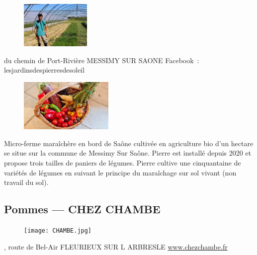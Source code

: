 \documentclass[8pt,a4paper,french]{article}
\makeatletter
\newcommand{\authoredby}[1]{\addtocontents{toc}{\protect\@nameuse{authoredby#1}}}%
\makeatother
\begin{document}
\begin{figure}
\includegraphics[width=0.3\textwidth]{LALAURE1.jpg}
\end{figure}

 du chemin de Port-Rivière MESSIMY SUR SAONE\newline
Facebook\ : lesjardinsdespierresdesoleil\newline

\vspace{6em}

\begin{figure}
\includegraphics[width=0.4\textwidth]{LALAURE2.jpg}
\end{figure}
\noindent Micro-ferme maraîchère en bord de Saône cultivée en agriculture bio
d'un hectare se situe sur la commune de Messimy Sur Saône. Pierre est
installé depuis 2020 et propose trois tailles de paniers de légumes.
Pierre cultive une cinquantaine de variétés de légumes en suivant le
principe du maraîchage sur sol vivant (non travail du sol).

\vspace{10em}

\authoredby{B}
\subsection{Pommes --- CHEZ CHAMBE}\label{subsec:pommes}

\begin{figure}
\texttt{[image: CHAMBE.jpg]}
\end{figure}

, route de Bel-Air FLEURIEUX SUR L ARBRESLE\newline
\href{https://www.chezchambe.fr/}{www.chezchambe.fr}\newline
\end{document}
